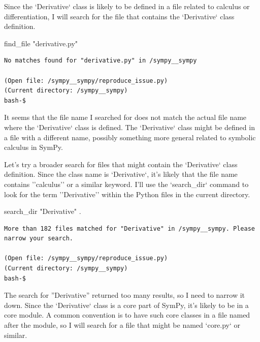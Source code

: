{\begin{agentbox}
Since the `Derivative` class is likely to be defined in a file related to calculus or differentiation, I will search for the file that contains the `Derivative` class definition.



\hrulefill
\begin{CodeVerbatim}[breaklines=true, breakanywhere=true]
find_file "derivative.py"
\end{CodeVerbatim}
\end{agentbox}
\begin{observationbox}\begin{Verbatim}[breaklines=true, breakanywhere=true]
No matches found for "derivative.py" in /sympy__sympy

(Open file: /sympy__sympy/reproduce_issue.py)
(Current directory: /sympy__sympy)
bash-$
\end{Verbatim}
\end{observationbox}
\begin{agentbox}
It seems that the file name I searched for does not match the actual file name where the `Derivative` class is defined. The `Derivative` class might be defined in a file with a different name, possibly something more general related to symbolic calculus in SymPy.



Let's try a broader search for files that might contain the `Derivative` class definition. Since the class name is `Derivative`, it's likely that the file name contains ''calculus'' or a similar keyword. I'll use the `search\_dir` command to look for the term ''Derivative'' within the Python files in the current directory.



\hrulefill
\begin{CodeVerbatim}[breaklines=true, breakanywhere=true]
search_dir "Derivative" .
\end{CodeVerbatim}
\end{agentbox}
\begin{observationbox}\begin{Verbatim}[breaklines=true, breakanywhere=true]
More than 182 files matched for "Derivative" in /sympy__sympy. Please narrow your search.

(Open file: /sympy__sympy/reproduce_issue.py)
(Current directory: /sympy__sympy)
bash-$
\end{Verbatim}
\end{observationbox}
\begin{agentbox}
The search for ''Derivative'' returned too many results, so I need to narrow it down. Since the `Derivative` class is a core part of SymPy, it's likely to be in a core module. A common convention is to have such core classes in a file named after the module, so I will search for a file that might be named `core.py` or similar.




\end{agentbox}}
